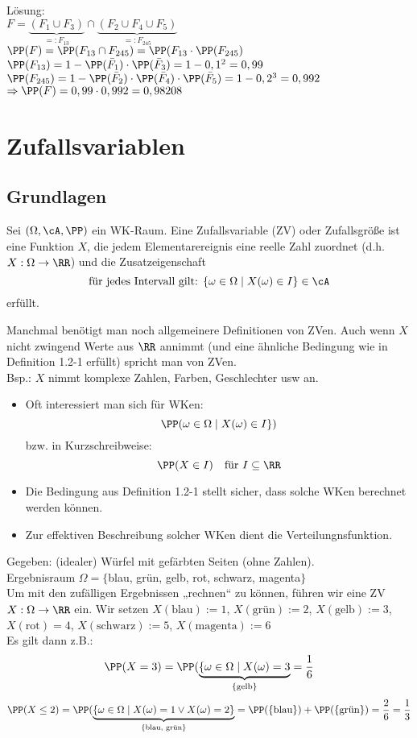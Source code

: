 \documentclass{scrreprt}
\begin{document}
Lösung:\\
$F=\underbrace{(F_1 \cup F_3)}_{=:F_{13}} \cap \underbrace{(F_2\cup F_4 \cup F_5)}_{=:F_{245}}$\\
$\PP(F) = \PP(F_{13} \cap F_{245} ) = \PP(F_{13} \cdot \PP(F_{245})$\\
$\PP(F_{13})=1-\PP(\bar F_1) \cdot \PP(\bar F_3) = 1- 0,1^2 = 0,99$\\
$\PP(F_{245})=1-\PP(\bar F_2) \cdot \PP(\bar F_4) \cdot \PP(\bar F_5) = 1-0,2^3=0,992$\\
$\Rightarrow \PP(F) = 0,99\cdot 0,992 = 0,98208$

\section{Zufallsvariablen}

\subsection{Grundlagen}

 Sei $(\Omega,  \cA, \PP)$ ein WK-Raum. Eine Zufallsvariable (ZV) oder Zufallsgröße ist eine Funktion $X$, die jedem Elementarereignis eine reelle Zahl zuordnet (d.h. $X: \Omega \to \RR$) und die Zusatzeigenschaft
$$\text{für jedes Intervall gilt: }\{\omega \in \Omega \;|\;  X(\omega) \in I\} \in \cA$$
erfüllt.

 Manchmal benötigt man noch allgemeinere Definitionen von ZVen. Auch wenn $X$ nicht zwingend Werte aus $\RR$ annimmt (und eine ähnliche Bedingung wie in Definition 1.2-1 erfüllt) spricht man von ZVen.\\
Bsp.: $X$ nimmt komplexe Zahlen, Farben, Geschlechter usw an.

\begin{itemize}
\item Oft interessiert man sich für WKen:
$$\PP(\omega \in \Omega \;|\; X(\omega) \in I\})$$
bzw. in Kurzschreibweise:
$$\PP(X\in I) \quad \text{für }I \subseteq \RR$$
\item Die Bedingung aus Definition 1.2-1 stellt sicher, dass solche WKen berechnet werden können.
\item Zur effektiven Beschreibung solcher WKen dient die Verteilungnsfunktion.
\end{itemize}

 Gegeben: (idealer) Würfel mit gefärbten Seiten (ohne Zahlen). \\
Ergebnisraum $\Omega = \{$blau, grün, gelb, rot, schwarz, magenta$\}$\\
Um mit den zufälligen Ergebnissen „rechnen“ zu können, führen wir eine ZV $X: \Omega \to \RR$ ein. Wir setzen $X(\text{blau}):=1$, $X(\text{grün}):=2$, $X(\text{gelb}):=3$, $X(\text{rot})=4$, $X(\text{schwarz}):=5$, $X(\text{magenta}):=6$\\
Es gilt dann z.B.:
$$\PP(X=3) = \PP(\underbrace{\{ \omega \in \Omega \;|\; X(\omega) = 3}_{\{\text{gelb}\}} = \frac{1}{6}$$
$$\PP(X \leq 2) = \PP(\underbrace{\{\omega \in \Omega \;|\; X(\omega) = 1 \vee X(\omega) = 2\}}_{\{\text{blau, grün}\}}=\PP(\{\text{blau}\}) + \PP(\{\text{grün}\}) = \frac{2}{6}=\frac{1}{3}$$
\end{document}
